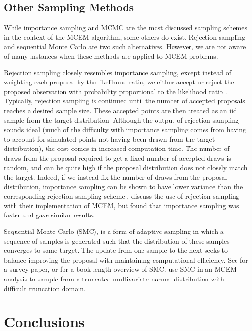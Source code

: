 \documentclass[11pt, oneside]{article}   	%
\begin{document}
\subsection{Other Sampling Methods}

While importance sampling and MCMC are the most discussed sampling schemes in the context of the MCEM algorithm, some others do exist. Rejection sampling and sequential Monte Carlo are two such alternatives. However, we are not aware of many instances when these methods are applied to MCEM problems.

Rejection sampling closely resembles importance sampling, except instead of weighting each proposal by the likelihood ratio, we either accept or reject the proposed observation with probability proportional to the likelihood ratio \citep{Cho20}. Typically, rejection sampling is continued until the number of accepted proposals reaches a desired sample size. These accepted points are then treated as an iid sample from the target distribution. Although the output of rejection sampling sounds ideal (much of the difficulty with importance sampling comes from having to account for simulated points not having been drawn from the target distribution), the cost comes in increased computation time. The number of draws from the proposal required to get a fixed number of accepted draws is random, and can be quite high if the proposal distribution does not closely match the target. Indeed, if we instead fix the number of draws from the proposal distribution, importance sampling can be shown to have lower variance than the corresponding rejection sampling scheme \citep[see Section 8.8 of][]{Cho20}. \citet{Boo99} discuss the use of rejection sampling with their implementation of MCEM, but found that importance sampling was faster and gave similar results.

Sequential Monte Carlo (SMC), is a form of adaptive sampling in which a sequence of samples is generated such that the distribution of these samples converges to some target. The update from one sample to the next seeks to balance improving the proposal with maintaining computational efficiency. See \citet{Del06} for a survey paper, or \citet{Cho20} for a book-length overview of SMC. \citet{Mof14} use SMC in an MCEM analysis to sample from a truncated multivariate normal distribution with difficult truncation domain.


\section{Conclusions}
\label{sec2:conc}
\end{document}
